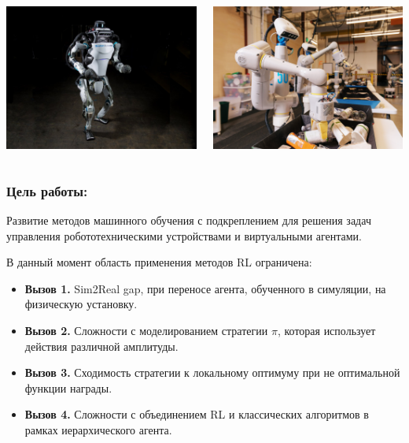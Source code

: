 \begin{frame}
\begin{columns}
\centering
\includegraphics[width=0.8\linewidth]{Presentation/images/boston_dunamics.jpg}

\vspace{10pt}
\centering
\includegraphics[width=0.8\linewidth]{Presentation/images/garbage_sorting.png}

\end{columns} 
\end{frame}

\begin{frame}
    \setlength{\leftmargini}{0cm}
    \frametitle{Цель работы:}
     Развитие методов машинного обучения с подкреплением для решения задач управления робототехническими устройствами и виртуальными агентами.

    \vspace{20pt}
    В данный момент область применения методов RL ограничена:
    \begin{itemize}
        \item[] \textbf{Вызов 1.} Sim2Real gap, при переносе агента, обученного в симуляции, на физическую установку.
        \item[] \textbf{Вызов 2.} Сложности с моделированием стратегии $\pi$, которая использует действия различной амплитуды.
        \item[] \textbf{Вызов 3.} Сходимость стратегии к локальному  оптимуму при не оптимальной функции награды.
       \item[] \textbf{Вызов 4.} Сложности с объединением RL и классических алгоритмов в рамках иерархического агента.
    \end{itemize}
\end{frame}

